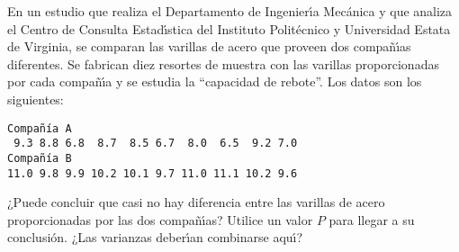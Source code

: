 \begin{enunciado}
 En un estudio que realiza el Departamento de Ingenier\'{\i}a Mec\'anica y que analiza el Centro de Consulta Estad\'{\i}stica del Instituto Polit\'ecnico y Universidad Estata de Virginia, se comparan las varillas de acero que proveen dos compa\~n\'{\i}as diferentes.
 Se fabrican diez resortes de muestra con las varillas proporcionadas por cada compa\~n\'{\i}a y se estudia la ``capacidad de rebote''.
 Los datos son los siguientes:
 \begin{verbatim}
Compañía A
 9.3 8.8 6.8  8.7  8.5 6.7  8.0  6.5  9.2 7.0
Compañía B
11.0 9.8 9.9 10.2 10.1 9.7 11.0 11.1 10.2 9.6
 \end{verbatim}
 \vspace{-0.5cm}
 ¿Puede concluir que casi no hay diferencia entre las varillas de acero proporcionadas por las dos compa\~n\'{\i}as?
 Utilice un valor $P$ para llegar a su conclusi\'on.
 ¿Las varianzas deber\'{\i}an combinarse aqu\'{\i}?
\end{enunciado}

